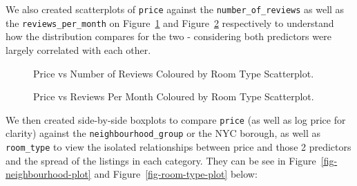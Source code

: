 \documentclass[
  letterpaper,
  DIV=11,
  numbers=noendperiod]{scrartcl}
\begin{document}
We also created scatterplots of \texttt{price} against the
\texttt{number\_of\_reviews} as well as the \texttt{reviews\_per\_month}
on Figure~\ref{fig-price-v-reviews-plot} and
Figure~\ref{fig-price-v-reviews-per-month-plot} respectively to
understand how the distribution compares for the two - considering both
predictors were largely correlated with each other.

\begin{figure}[H]


\caption{\label{fig-price-v-reviews-plot}Price vs Number of Reviews
Coloured by Room Type Scatterplot.}

\end{figure}%

\begin{figure}[H]


\caption{\label{fig-price-v-reviews-per-month-plot}Price vs Reviews Per
Month Coloured by Room Type Scatterplot.}

\end{figure}%

We then created side-by-side boxplots to compare \texttt{price} (as well
as log price for clarity) against the \texttt{neighbourhood\_group} or
the NYC borough, as well as \texttt{room\_type} to view the isolated
relationships between price and those 2 predictors and the spread of the
listings in each category. They can be see in
Figure~\ref{fig-neighbourhood-plot} and Figure~\ref{fig-room-type-plot}
below:
\end{document}
